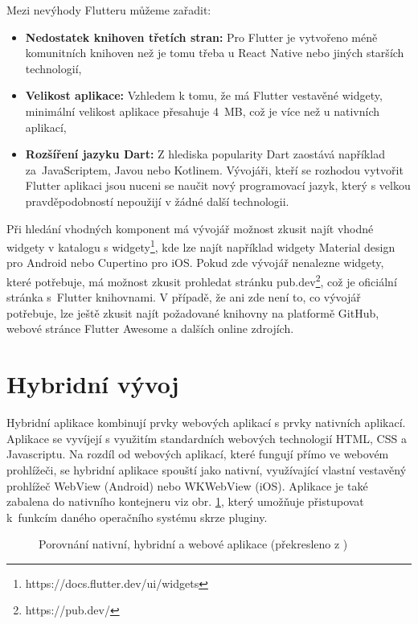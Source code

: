 \documentclass[czech, bc, kiv, he, iso690numb]{fasthesis}
\begin{document}
\noindent Mezi nevýhody Flutteru můžeme zařadit:
\begin{itemize}
    \item \textbf{Nedostatek knihoven třetích stran:} Pro Flutter je vytvořeno méně komunitních knihoven než je tomu třeba u React Native nebo jiných starších technologií,
    \item \textbf{Velikost aplikace:} Vzhledem k tomu, že má Flutter vestavěné widgety, minimální velikost aplikace přesahuje 4~MB, což je více než u nativních aplikací,
    \item \textbf{Rozšíření jazyku Dart:} Z hlediska popularity Dart zaostává například za~JavaScriptem, Javou nebo Kotlinem. Vývojáři, kteří se rozhodou vytvořit Flutter aplikaci jsou nuceni se naučit nový programovací jazyk, který s velkou pravděpodobností nepoužijí v žádné další technologii.
\end{itemize}

Při hledání vhodných komponent má vývojář možnost zkusit najít vhodné widgety v katalogu s widgety\footnote{https://docs.flutter.dev/ui/widgets}, kde lze najít například widgety Material design pro Android nebo Cupertino pro iOS. Pokud zde vývojář nenalezne widgety, které potřebuje, má možnost zkusit prohledat stránku pub.dev\footnote{https://pub.dev/}, což je oficiální stránka s~Flutter knihovnami. V případě, že ani zde není to, co vývojář potřebuje, lze ještě zkusit najít požadované knihovny na platformě GitHub, webové stránce Flutter Awesome a dalších online zdrojích.

\section{Hybridní vývoj} \label{hybrid_development}

Hybridní aplikace kombinují prvky webových aplikací s prvky nativních aplikací. Aplikace se vyvíjejí s využitím standardních webových technologií \gls{HTML}, \gls{CSS} a Javascriptu. Na rozdíl od webových aplikací, které fungují přímo ve webovém prohlížeči, se hybridní aplikace spouští jako nativní, využívající vlastní vestavěný prohlížeč WebView (Android) nebo WKWebView (iOS). Aplikace je také zabalena do nativního kontejneru viz obr. \ref{fig:hybrid_schema}, který umožňuje přistupovat k~funkcím daného operačního systému skrze pluginy.

\begin{figure}[htbp]
    \centering
    
    \caption{Porovnání nativní, hybridní a webové aplikace (překresleno z \cite{hybrid-app-picture})}
    \label{fig:hybrid_schema}
\end{figure}
\end{document}
